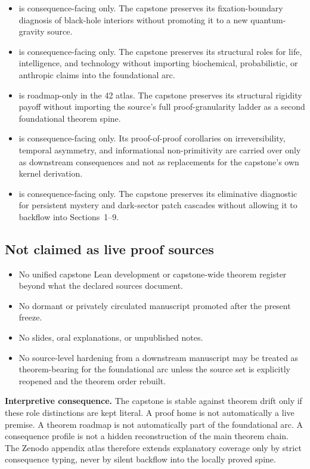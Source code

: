 \begin{itemize}
  \item \blackholesdoc{} is consequence-facing only. The capstone preserves its fixation-boundary diagnosis of black-hole interiors without promoting it to a new quantum-gravity source.
  \item \lifedoc{} is consequence-facing only. The capstone preserves its structural roles for life, intelligence, and technology without importing biochemical, probabilistic, or anthropic claims into the foundational arc.
  \item \minddoc{} is roadmap-only in the 42 atlas. The capstone preserves its structural rigidity payoff without importing the source's full proof-granularity ladder as a second foundational theorem spine.
  \item \metanecessitydoc{} is consequence-facing only. Its proof-of-proof corollaries on irreversibility, temporal asymmetry, and informational non-primitivity are carried over only as downstream consequences and not as replacements for the capstone's own kernel derivation.
  \item \metamysterydoc{} is consequence-facing only. The capstone preserves its eliminative diagnostic for persistent mystery and dark-sector patch cascades without allowing it to backflow into Sections~1--9.
\end{itemize}

\subsection*{Not claimed as live proof sources}

\begin{itemize}
  \item No unified capstone Lean development or capstone-wide theorem register beyond what the declared sources document.
  \item No dormant or privately circulated manuscript promoted after the present freeze.
  \item No slides, oral explanations, or unpublished notes.
  \item No source-level hardening from a downstream manuscript may be treated as theorem-bearing for the foundational arc unless the source set is explicitly reopened and the theorem order rebuilt.
\end{itemize}

\begin{reviewbox}
\textbf{Interpretive consequence.} The capstone is stable against theorem drift only if these role distinctions are kept literal. A proof home is not automatically a live premise. A theorem roadmap is not automatically part of the foundational arc. A consequence profile is not a hidden reconstruction of the main theorem chain. The Zenodo appendix atlas therefore extends explanatory coverage only by strict consequence typing, never by silent backflow into the locally proved spine.
\end{reviewbox}
